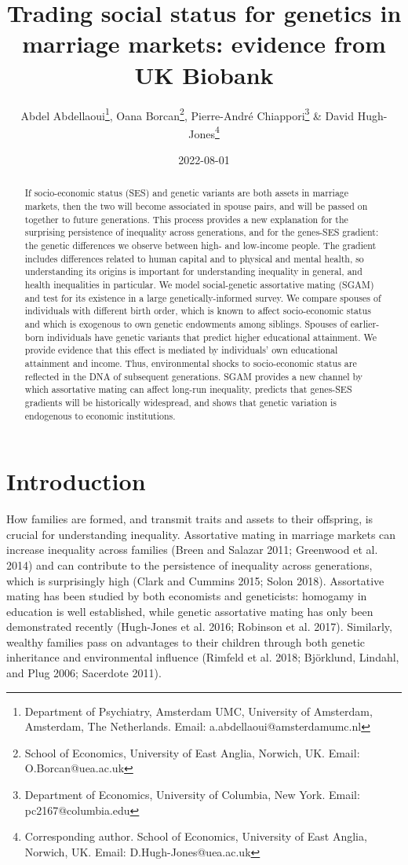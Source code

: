 \documentclass[
]{article}
\title{Trading social status for genetics in marriage markets: evidence from UK Biobank}
\author{Abdel Abdellaoui\thanks{Department of Psychiatry, Amsterdam UMC, University 
of Amsterdam, Amsterdam, The Netherlands. Email: a.abdellaoui@amsterdamumc.nl},
Oana Borcan\thanks{School of Economics, University of East Anglia, Norwich, 
UK. Email: O.Borcan@uea.ac.uk},
Pierre-André Chiappori\thanks{Department of Economics, University of Columbia, 
  New York. Email: pc2167@columbia.edu} \&
David Hugh-Jones\thanks{Corresponding author. School of Economics, 
University of East Anglia, Norwich, UK. Email: D.Hugh-Jones@uea.ac.uk}}
\date{2022-08-01}
\theoremstyle{definition}
\theoremstyle{definition}
\theoremstyle{definition}
\theoremstyle{definition}
\theoremstyle{remark}
\begin{document}
\maketitle
\begin{abstract}
If socio-economic status (SES) and genetic variants are both assets in marriage
markets, then the two will become associated in spouse pairs, and will be
passed on together to future generations. This process provides a new
explanation for the surprising persistence of inequality across generations,
and for the genes-SES gradient: the genetic differences we observe between
high- and low-income people. The gradient includes differences related
to human capital and to physical and mental health, so understanding its origins
is important for understanding inequality in general, and health inequalities
in particular. We model social-genetic assortative mating
(SGAM) and test for its existence in a large genetically-informed survey. We
compare spouses of individuals with different birth order, which is known to
affect socio-economic status and which is exogenous to own genetic endowments
among siblings. Spouses of earlier-born individuals have genetic variants that
predict higher educational attainment. We provide evidence that this effect is
mediated by individuals' own educational attainment and income. Thus,
environmental shocks to socio-economic status are reflected in the DNA of
subsequent generations. SGAM provides a new channel by which assortative
mating can affect long-run inequality, predicts that genes-SES gradients will
be historically widespread, and shows that genetic variation is endogenous to
economic institutions.
\end{abstract}

\normalem

\hypertarget{introduction}{%
\section{Introduction}\label{introduction}}

How families are formed, and transmit traits and assets to their offspring, is
crucial for understanding inequality. Assortative mating in marriage markets can
increase inequality across families (Breen and Salazar 2011; Greenwood et al. 2014)
and can contribute to the persistence of inequality across generations, which
is surprisingly high (Clark and Cummins 2015; Solon 2018). Assortative
mating has been studied by both economists and geneticists: homogamy in education
is well established, while genetic assortative mating has only been demonstrated
recently (Hugh-Jones et al. 2016; Robinson et al. 2017). Similarly, wealthy
families pass on advantages to their children through both genetic inheritance
and environmental influence (Rimfeld et al. 2018; Björklund, Lindahl, and Plug 2006; Sacerdote 2011).
\end{document}
